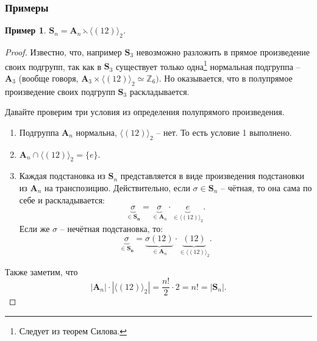 \documentclass{article}
\newtheorem{example}{Пример}[section]
\begin{document}
\subsubsection{Примеры}

\begin{example}
    $\mathbf{S}_n = \mathbf{A}_n \leftthreetimes \langle (12) \rangle_2$.
\end{example}
\begin{proof}
    Известно, что, например $\mathbf{S}_3$ невозможно разложить в прямое произведение своих подгрупп, так как в $\mathbf{S}_3$ существует только одна\footnote{Следует из теорем Силова.} нормальная подгруппа -- $\mathbf{A}_3$  (вообще говоря, $\mathbf{A}_3 \times \langle (12) \rangle_2 \simeq \mathbb{Z}_6)$. Но оказывается, что в полупрямое произведение своих подгрупп $\mathbf{S}_3$ раскладывается.

    Давайте проверим три условия из определения полупрямого произведения.
    
    \begin{enumerate}
        \item Подгруппа $\mathbf{A}_n$ нормальна, $\langle (12) \rangle_2$ -- нет. То есть условие 1 выполнено.
        \item $\mathbf{A}_n \cap \langle (12) \rangle_2 = \{ e \}$.
        \item Каждая подстановка из $\mathbf{S}_n$ представляется в виде произведения подстановки из $\mathbf{A}_n$ на транспозицию. Действительно, если $\sigma \in \mathbf{S}_n$ -- чётная, то она сама по себе и раскладывается:
        $$ \underbrace{\sigma}_{\in \mathbf{S_n}} = \underbrace{\sigma}_{\in \mathbf{A}_n} \cdot \underbrace{e}_{\in \langle (12) \rangle_2}. $$
        Если же $\sigma$ -- нечётная подстановка, то:
        $$ \underbrace{\sigma}_{\in \mathbf{S_n}} = \underbrace{\sigma (12)}_{\in \mathbf{A}_n} \cdot \underbrace{(12)}_{\in \langle (12) \rangle_2}. $$
    \end{enumerate}
    
    Также заметим, что $$ |\mathbf{A}_n| \cdot |\langle (12) \rangle_2| = \frac{n!}{2} \cdot 2 = n! = |\mathbf{S}_n|. $$
\end{proof}
\end{document}
